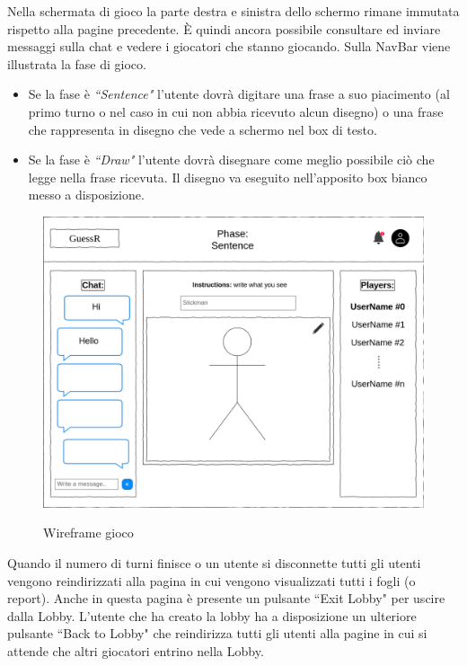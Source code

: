 \noindent Nella schermata di gioco la parte destra e sinistra dello schermo rimane immutata rispetto alla pagine precedente. È quindi ancora possibile consultare ed inviare messaggi sulla chat e vedere i giocatori che stanno giocando.\newline
Sulla NavBar viene illustrata la fase di gioco.
\begin{itemize}
    \item Se la fase è \textit{``Sentence"} l'utente dovrà digitare una frase a suo piacimento (al primo turno o nel caso in cui non abbia ricevuto alcun disegno) o una frase che rappresenta in disegno che vede a schermo nel box di testo.
    \item Se la fase è \textit{``Draw"} l'utente dovrà disegnare come meglio possibile ciò che legge nella frase ricevuta.
    Il disegno va eseguito nell'apposito box bianco messo a disposizione.
\end{itemize}

\begin{figure}[H]
    \caption{Wireframe gioco}
    \centering
    \includegraphics[width=400mm]{img/wireframes/in_game.png}
    \label{fig:wireframe_in_game_desktop}
\end{figure}

\noindent Quando il numero di turni finisce o un utente si disconnette tutti gli utenti vengono reindirizzati alla pagina in cui vengono visualizzati tutti i fogli (o report). Anche in questa pagina è presente un pulsante ``Exit Lobby" per uscire dalla Lobby. L'utente che ha creato la lobby ha a disposizione un ulteriore pulsante ``Back to Lobby" che reindirizza tutti gli utenti alla pagine in cui si attende che altri giocatori entrino nella Lobby. 

